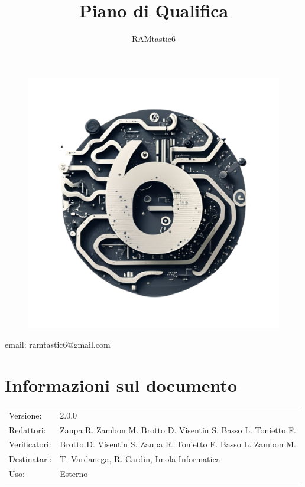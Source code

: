 \documentclass[12pt, oneside]{article}
\author{RAMtastic6}
\begin{document}
\thispagestyle{empty}
\title{Piano di Qualifica}
\maketitle
\begin{figure}[h]
  \centering
  \includegraphics[scale=0.3]{logo.png}
\end{figure}
\begin{center}
    email: ramtastic6@gmail.com
\end{center}

\section*{Informazioni sul documento}
\begin{tabular}{ll}
Versione: & 2.0.0 \\
Redattori: & Zaupa R. Zambon M. Brotto D. Visentin S. Basso L. Tonietto F. \\
Verificatori: & Brotto D. Visentin S. Zaupa R. Tonietto F. Basso L. Zambon M.\\ 
Destinatari: & T. Vardanega, R. Cardin, Imola Informatica \\
Uso: & Esterno
\end{tabular}
\newpage
\end{document}
